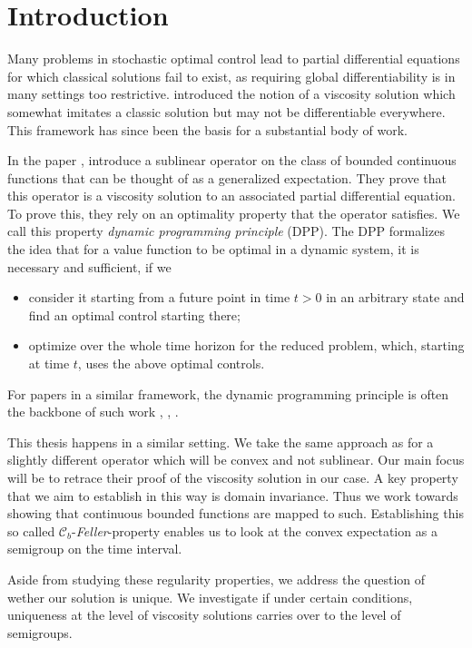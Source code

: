 \chapter*{Introduction}
	Many problems in stochastic optimal control lead to partial differential equations for which classical solutions fail to exist, as requiring global differentiability is in many settings too restrictive. \citeauthor{CrandallLions1983} introduced the notion of a viscosity solution which somewhat imitates a classic solution but may not be differentiable everywhere. This framework has since been the basis for a substantial body of work.

In the paper \cite{MSFPND}, \citeauthor{MSFPND} introduce a sublinear operator on the class of bounded continuous functions that can be thought of as a generalized expectation. They prove that this operator is a viscosity solution to an associated partial differential equation. To prove this, they rely on an optimality property that the operator satisfies. We call this property \emph{dynamic programming principle} (DPP). The DPP formalizes the idea that for a value function to be optimal in a dynamic system, it is necessary and sufficient, if we
\begin{itemize}
	\item consider it starting from a future point in time $t > 0$ in an arbitrary state and find an optimal control starting there;
	\item optimize over the whole time horizon for the reduced problem, which, starting at time $t$, uses the above optimal controls.
\end{itemize}
For papers in a similar framework, the dynamic programming principle is often the backbone of such work \cite[p.64]{Pham}, \cite[p. 6]{CriensJEE}, \cite[thm. 2.3]{Nutz}.	

This thesis happens in a similar setting. We take the same approach as \citeauthor{MSFPND} for a slightly different operator which will be convex and not sublinear. Our main focus will be to retrace their proof of the viscosity solution in our case. A key property that we aim to establish in this way is domain invariance. Thus we work towards showing that continuous bounded functions are mapped to such. Establishing this so called $\mathcal{C}_b$-\emph{Feller}-property enables us to look at the convex expectation as a semigroup on the time interval. 

Aside from studying these regularity properties, we address the question of wether our solution is unique. We investigate if under certain conditions, uniqueness at the level of viscosity solutions carries over to the level of semigroups. \newpage


